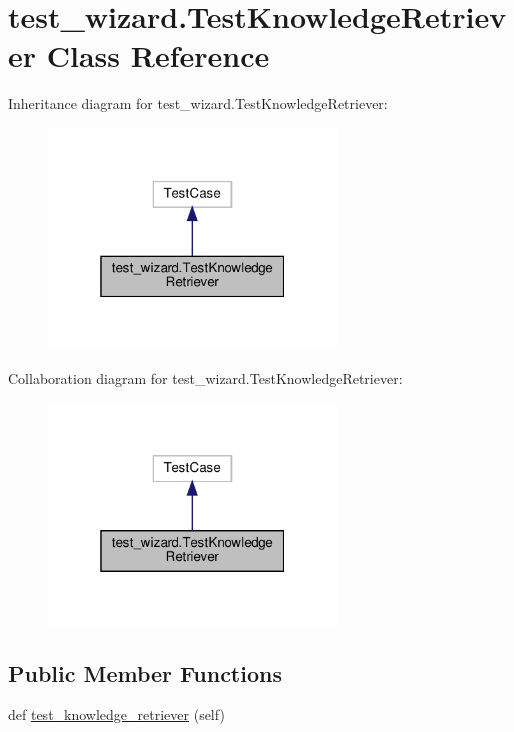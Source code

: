 \hypertarget{classtest__wizard_1_1TestKnowledgeRetriever}{}\section{test\+\_\+wizard.\+Test\+Knowledge\+Retriever Class Reference}
\label{classtest__wizard_1_1TestKnowledgeRetriever}


Inheritance diagram for test\+\_\+wizard.\+Test\+Knowledge\+Retriever\+:
\nopagebreak
\begin{figure}[H]
\begin{center}
\leavevmode
\includegraphics[width=217pt]{d3/d49/classtest__wizard_1_1TestKnowledgeRetriever__inherit__graph}
\end{center}
\end{figure}


Collaboration diagram for test\+\_\+wizard.\+Test\+Knowledge\+Retriever\+:
\nopagebreak
\begin{figure}[H]
\begin{center}
\leavevmode
\includegraphics[width=217pt]{d6/dcb/classtest__wizard_1_1TestKnowledgeRetriever__coll__graph}
\end{center}
\end{figure}
\subsection*{Public Member Functions}
\begin{DoxyCompactItemize}
\item 
def \hyperlink{classtest__wizard_1_1TestKnowledgeRetriever_a3cfca11721cc581c2dde4d3cc15bb8c9}{test\+\_\+knowledge\+\_\+retriever} (self)
\end{DoxyCompactItemize}


